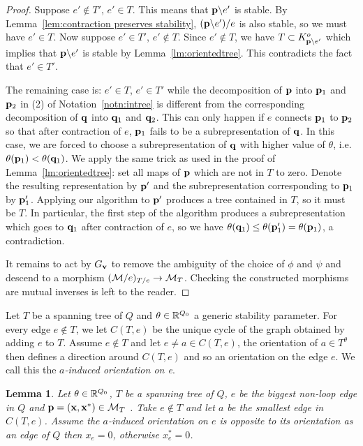 \documentclass{amsart}
\newtheorem{lem}[thm]{Lemma}
\theoremstyle{definition}
\begin{document}
\begin{proof}
Suppose $e'\notin T'$, $e'\in T$. This means that $\mathbf{p}\backslash e'$ is stable. By Lemma~\ref{lem:contraction preserves stability}, $(\mathbf{p}\backslash e')/e$ is also stable, so we must have $e'\in T$.
Now suppose $e'\in T'$, $e'\notin T$. Since $e'\notin T$, we have $T \subset K^o_{\mathbf{p}\backslash e'}$ which implies that $\mathbf{p}\backslash e'$ is stable by Lemma~\ref{lm:orientedtree}. This contradicts the fact that $e'\in T'$.

The remaining case is: $e'\in T$, $e'\in T'$ while the decomposition of $\mathbf{p}$ into $\mathbf{p}_1$ and $\mathbf{p}_2$ in (2) of Notation~\ref{notn:intree} is different from the corresponding decomposition of $\mathbf{q}$ into $\mathbf{q}_1$ and $\mathbf{q}_2$. This can only happen if $e$ connects $\mathbf{p}_1$ to $\mathbf{p}_2$ so that after contraction of $e$, $\mathbf{p}_1$ fails to be a subrepresentation of $\mathbf{q}$. In this case, we are forced to choose a subrepresentation of $\mathbf{q}$ with higher value of $\theta$, i.e.\ $\theta(\mathbf{p}_1)<\theta(\mathbf{q}_1)$. We apply the same trick as used in the proof of Lemma~\ref{lm:orientedtree}: set all maps of $\mathbf{p}$ which are not in $T$ to zero. Denote the resulting representation by $\mathbf{p}'$ and the subrepresentation corresponding to $\mathbf{p}_1$ by $\mathbf{p}_1'$. Applying our algorithm to $\mathbf{p}'$ produces a tree contained in $T$, so it must be $T$. In particular, the first step of the algorithm produces a subrepresentation which goes to $\mathbf{q}_1$ after contraction of $e$, so we have  $\theta(\mathbf{q}_1)\leq\theta(\mathbf{p}_1')=\theta(\mathbf{p}_1)$, a contradiction.

It remains to act by $G_{\mathbf{v}}$ to remove the ambiguity of the choice of $\phi$ and $\psi$ and descend to a morphism $(\mathcal{M}/e)_{T/e} \rightarrow \mathcal{M}_T$.
Checking the constructed morphisms are mutual inverses is left to the reader.
\end{proof}

Let $T$ be a spanning tree of $Q$ and $\theta\in \mathbb{R}^{Q_0}$ a generic stability parameter.
For every edge $e \notin T$, we let $C(T,e)$ be the unique cycle of the graph obtained by adding $e$ to $T$.
Assume $e \notin T$ and let $e \neq a \in C(T,e)$, the orientation of $a \in T^\theta$ then defines a direction around $C(T,e)$ and so an orientation on the edge $e$.
We call this the {\em $a$-induced orientation on e}.

\begin{lem}\label{lm:xe=0}
Let $\theta\in \mathbb{R}^{Q_0}$, $T$ be a spanning tree of $Q$, $e$ be the biggest non-loop edge in $Q$ and $\mathbf{p}=(\mathbf{x},\mathbf{x}^*) \in \mathcal{M}_T$ .
Take $e \notin T$ and let $a$ be the smallest edge in $C(T,e)$.
Assume the $a$-induced orientation on $e$ is opposite to its orientation as an edge of $Q$ then $x_e=0$, otherwise $x_e^*=0$.
\end{lem}
\end{document}
